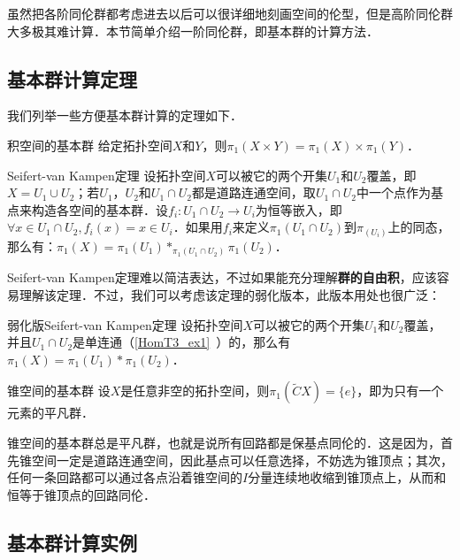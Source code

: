 

虽然把各阶同伦群都考虑进去以后可以很详细地刻画空间的伦型，但是高阶同伦群大多极其难计算．本节简单介绍一阶同伦群，即基本群的计算方法．

\subsection{基本群计算定理}

我们列举一些方便基本群计算的定理如下．

\begin{theorem}{积空间的基本群}
给定拓扑空间$X$和$Y$，则$\pi_1(X\times Y)=\pi_1(X)\times\pi_1(Y)$．
\end{theorem}

\begin{theorem}{Seifert-van Kampen定理}
设拓扑空间$X$可以被它的两个开集$U_1$和$U_2$覆盖，即$X=U_1\cup U_2$；若$U_1$，$U_2$和$U_1\cap U_2$都是道路连通空间，取$U_1\cap U_2$中一个点作为基点来构造各空间的基本群．设$f_i:U_1\cap U_2\rightarrow U_i$为恒等嵌入，即$\forall x\in U_1\cap U_2, f_i(x)=x\in U_i$．如果用$f_i$来定义$\pi_1(U_1\cap U_2)$到$\pi_(U_i)$上的同态，那么有：$\pi_1(X)=\pi_1(U_1)*_{\pi_1(U_1\cap U_2)}\pi_1(U_2)$．
\end{theorem}

Seifert-van Kampen定理难以简洁表达，不过如果能充分理解\textbf{群的自由积}，应该容易理解该定理．不过，我们可以考虑该定理的弱化版本，此版本用处也很广泛：

\begin{theorem}{弱化版Seifert-van Kampen定理}
设拓扑空间$X$可以被它的两个开集$U_1$和$U_2$覆盖，并且$U_1\cap U_2$是单连通（\autoref{HomT3_ex1}~）的，那么有$\pi_1(X)=\pi_1(U_1)*\pi_1(U_2)$．
\end{theorem}

\begin{theorem}{锥空间的基本群}
设$X$是任意非空的拓扑空间，则$\pi_1(\widetilde{C}X)=\{e\}$，即为只有一个元素的平凡群．
\end{theorem}

锥空间的基本群总是平凡群，也就是说所有回路都是保基点同伦的．这是因为，首先锥空间一定是道路连通空间，因此基点可以任意选择，不妨选为锥顶点；其次，任何一条回路都可以通过各点沿着锥空间的$I$分量连续地收缩到锥顶点上，从而和恒等于锥顶点的回路同伦．



\subsection{基本群计算实例}

